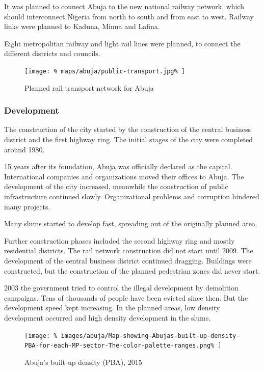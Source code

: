 \documentclass{article}
\begin{document}
\begin{multicols}{2}
			It was planned to connect Abuja to the new national railway network, which should interconnect Nigeria from north to south and from east to west.
			Railway links were planned to Kaduna, Minna and Lafina.
			
			Eight metropolitan railway and light rail lines were planned, to connect the different districts and councils. 
			
			\begin{figure}[H]
				\texttt{[image: \%
					maps/abuja/public-transport.jpg\%
				]}
				\caption{Planned rail transport network for Abuja \cite{ASplusP:AbujaTransportationConcept}}
				\label{fig:map:abuja-future-rail-network}
			\end{figure}	
			
			
			\subsubsection{Development}
			
			The construction of the city started by the construction of the central business district and the first highway ring. The initial stages of the city were completed around 1980.
			
			15 years after its foundation, Abuja was officially declared as the capital. International companies and organizations moved their offices to Abuja.
			The development of the city increased, meanwhile the construction of public infrastructure continued slowly. Organizational problems and corruption hindered many projects.
			
			Many slums started to develop fast, spreading out of the originally planned area.

			
			
			Further construction phases included the second highway ring and mostly residential districts. The rail network construction did not start until 2009. The development of the central business district continued dragging. Buildings were constructed, but the construction of the planned pedestrian zones did never start.
			
			2003 the government tried to control the illegal development by demolition campaigns. Tens of thousands of people have been evicted since then. But the development speed kept increasing. In the planned areas, low density development occurred and high density development in the slums.
			
			\begin{figure}[H]
				\texttt{[image: \%
					images/abuja/Map-showing-Abujas-built-up-density-PBA-for-each-MP-sector-The-color-palette-ranges.png\%
				]}
				\caption{Abuja's built-up density (PBA), 2015  \cite{ResearchGate:AbujaDensity}}
				\label{fig:images:abuja-density}
			\end{figure}
			

\end{multicols}
\end{document}
